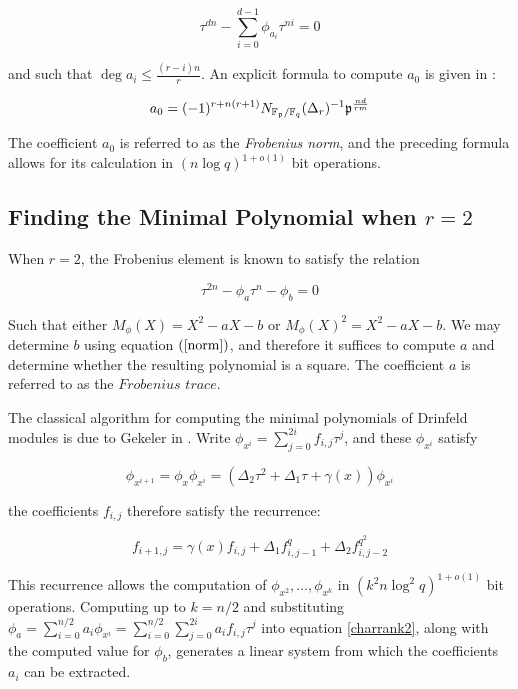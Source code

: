 \begin{equation*}
    \tau^{dn} - \sum_{i=0}^{d-1}\phi_{a_i} \tau^{ni} = 0
\end{equation*}

and such that $\deg a_i \leq \frac{(r - i)n}{r}$. An explicit formula to compute $a_0$ is given in \cite{GaPa18}:

\begin{equation}\label{norm}
    a_0 = (-1)^{r + n(r+1)}N_{\mathbb{F}_{\mathfrak{p}}/\mathbb{F}_q}(\Delta_r)^{-1} \mathfrak{p}^{ \frac{n d}{ r m}}
\end{equation}

The coefficient $a_0$ is referred to as the \textit{Frobenius norm}, and the preceding formula allows for its calculation in $(n\log q)^{1+o(1)}$ bit operations. 

\subsection{Finding the Minimal Polynomial when $r = 2$}
When $r = 2$, the Frobenius element is known to satisfy the relation

\begin{equation}\label{charrank2}
    \tau^{2n} - \phi_{a}\tau^n - \phi_b = 0
\end{equation}

Such that either $M_\phi(X) = X^2 - aX - b$ or $M_{\phi}(X)^2 = X^2 - aX - b$. We may determine $b$ using equation $(\ref{norm})$, and therefore it suffices to compute $a$ and determine whether the resulting polynomial is a square. The coefficient $a$ is referred to as the $\textit{Frobenius trace}$.

The classical algorithm for computing the minimal polynomials of Drinfeld modules is due to Gekeler in \cite{frobdist}. Write $\phi_{x^i} = \sum_{j=0}^{2i}f_{i,j}\tau^j$, and these $\phi_{x^i}$ satisfy

\begin{equation*}
    \phi_{x^{i+1}} = \phi_{x}\phi_{x^i} = (\Delta_2 \tau^2 + \Delta_1 \tau + \gamma(x))\phi_{x^i}
\end{equation*}

the coefficients $f_{i,j}$ therefore satisfy the recurrence:

\begin{equation}
 f_{i+1, j} =  \gamma(x)f_{i,j} + \Delta_1f_{i,j-1}^{q} + \Delta_2 f_{i, j-2}^{q^2}  
\end{equation}

This recurrence allows the computation of $\phi_{x^2}, \ldots, \phi_{x^k}$ in $(k^2n\log^2q)^{1+o(1)}$ bit operations. Computing up to $k = n/2$ and substituting $\phi_a = \sum_{i=0}^{n/2} a_i \phi_{x^i} = \sum_{i=0}^{n/2}\sum_{j = 0}^{2i} a_i f_{i,j}\tau^{j}$ into equation \ref{charrank2}, along with the computed value for $\phi_b$, generates a linear system from which the coefficients $a_i$ can be extracted.

